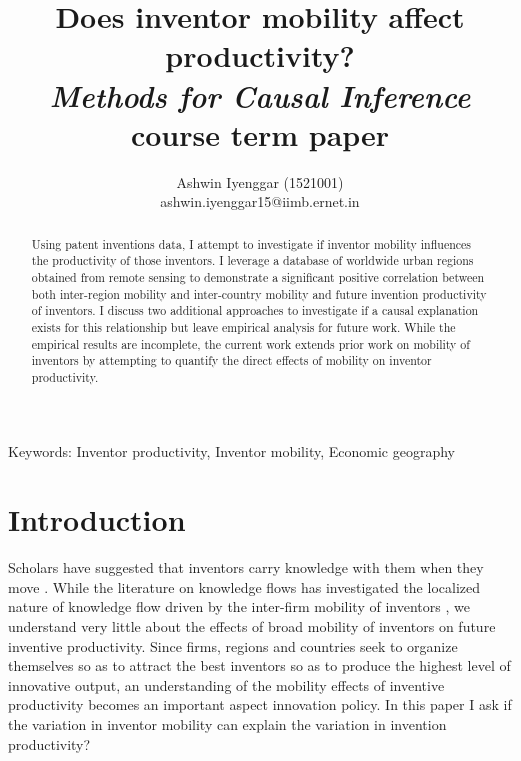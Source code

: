 \documentclass[12pt]{article}
\begin{document}
\title{\LARGE Does inventor mobility affect productivity?\\ \Large \textit{Methods for Causal Inference} course term paper}
\author{Ashwin Iyenggar  (1521001) \\ ashwin.iyenggar15@iimb.ernet.in} 
\large

\maketitle
\thispagestyle{empty}

\begin{abstract}
\large \noindent Using patent inventions data, I attempt to investigate if inventor mobility influences the productivity of those inventors. I leverage a database of worldwide urban regions  obtained from remote sensing to demonstrate a significant positive correlation between both inter-region mobility  and inter-country mobility and future invention productivity of inventors. I discuss two additional approaches to investigate if a causal explanation exists for this relationship but leave empirical analysis for future work. While the empirical results are incomplete, the current work extends prior work on mobility of inventors by attempting to quantify the direct effects of  mobility on inventor productivity.
\end{abstract}
{Keywords:} Inventor productivity, Inventor mobility, Economic geography
\onehalfspacing
\section{Introduction}
Scholars have suggested that inventors carry knowledge with them when they move \citep{Almeida1999}. While the literature on knowledge flows has investigated the localized nature of knowledge flow driven by the inter-firm mobility of inventors \citep{Jaffe1993, Almeida1999, Alcacer2006a}, we understand very little about the effects of broad mobility of inventors on future inventive productivity. Since firms, regions and countries seek to organize themselves so as to attract the best inventors so as to produce the highest level of innovative output, an understanding of the mobility effects of inventive productivity becomes an important aspect innovation policy. In this paper I ask if  the variation in inventor mobility can explain the variation in invention productivity?
\end{document}
